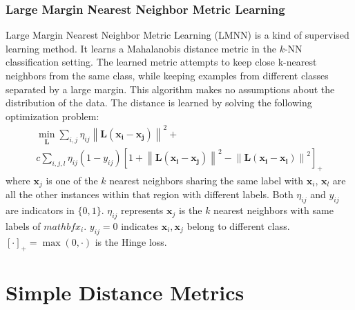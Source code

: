 \documentclass[conference]{IEEEtran}
\begin{document}
\subsubsection{Large Margin Nearest Neighbor Metric Learning}
\par
Large Margin Nearest Neighbor Metric Learning (LMNN) \cite{weinberger2009distance} is a kind of supervised learning method. It learns a Mahalanobis distance metric in the $k$-NN classification setting. 
The learned metric attempts to keep close k-nearest neighbors from the same class, while keeping examples from different classes separated by a large margin. This algorithm makes no assumptions about the distribution of the data.
The distance is learned by solving the following optimization problem:
\begin{equation}
	\begin{array}{l}
		\min _{\mathbf{L}} \sum_{i, j} \eta_{i j}\left\|\mathbf{L}\left(\mathbf{x}_{\mathbf{i}}-\mathbf{x}_{\mathbf{j}}\right)\right\|^{2}+\\
		c \sum_{i, j, l} \eta_{i j}\left(1-y_{i j}\right)\left[1+\left\|\mathbf{L}\left(\mathbf{x}_{\mathbf{i}}-\mathbf{x}_{\mathbf{j}}\right)\right\|^{2}-\left\|\mathbf{L}\left(\mathbf{x}_{\mathbf{i}}-\mathbf{x}_{\mathbf{l}}\right)\right\|^{2}\right]_{+}	
	\end{array}
\end{equation}
where $\mathbf{x}_j$ is one of the $k$ nearest neighbors sharing the same label with $\mathbf{x}_i$, $\mathbf{x}_l$ are all the other instances within that region with different labels. Both $\eta_{ij}$ and $y_{ij}$ are indicators in $\{0,1\}$. $\eta_{ij}$ represents $\mathbf{x}_j$ is the $k$ nearest neighbors with same labels of $mathbf{x}_i$.
$y_{ij}=0$ indicates $\mathbf{x}_i,\mathbf{x}_j$ belong to different class. $[\cdot]_+=\max(0,\cdot)$ is the Hinge loss.
\section{Simple Distance Metrics}
\end{document}
